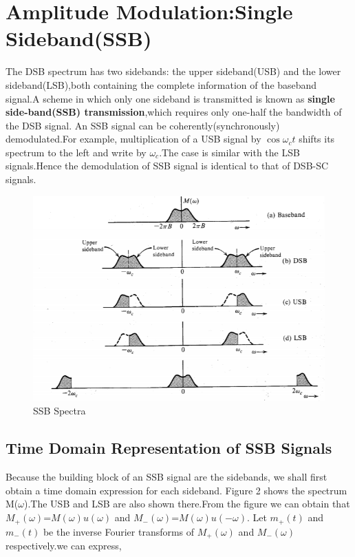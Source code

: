 \section{Amplitude Modulation:Single Sideband(SSB)}

The DSB spectrum has two sidebands: the upper sideband(USB) and the lower sideband(LSB),both containing the complete information of the baseband signal.A scheme in which only one sideband is transmitted is known as \textbf{single side-band(SSB) transmission},which requires only one-half the bandwidth of the DSB signal.
An SSB signal can be coherently(synchronously) demodulated.For example, multiplication of a USB signal by $\cos\omega_ct$ shifts its spectrum to the left and write by $\omega_c$.The case is similar with the LSB signals.Hence the demodulation of SSB signal is identical to that of DSB-SC signals.

\begin{figure}[H]
  \centering
  \includegraphics[]{Capture1.PNG}
  \caption{SSB Spectra}
\end{figure}

\subsection{Time Domain Representation of SSB Signals}
Because the building block of an SSB signal are the sidebands, we shall first obtain a time domain expression for each sideband. Figure 2 shows the spectrum M($\omega$).The USB and LSB are also shown there.From the figure we can obtain that $M_+(\omega)$=$M(\omega)u(\omega)$ and $M_-(\omega)$=$M(\omega)u(-\omega)$. Let $m_+(t)$ and $m_-(t)$ be the inverse Fourier transforms of $M_+(\omega)$ and $M_-(\omega)$ respectively.we can express,

